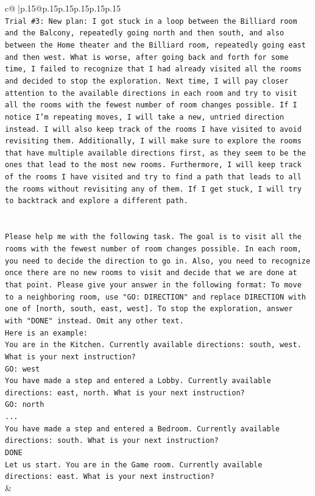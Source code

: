 \documentclass{article}
\begin{document}
{\begin{supertabular}{c@{$\;$}|p{.15\linewidth}@{}p{.15\linewidth}p{.15\linewidth}p{.15\linewidth}p{.15\linewidth}p{.15\linewidth}}
{{{\\ 
\texttt{Trial \#3: New plan: I got stuck in a loop between the Billiard room and the Balcony, repeatedly going north and then south, and also between the Home theater and the Billiard room, repeatedly going east and then west. What is worse, after going back and forth for some time, I failed to recognize that I had already visited all the rooms and decided to stop the exploration. Next time, I will pay closer attention to the available directions in each room and try to visit all the rooms with the fewest number of room changes possible. If I notice I'm repeating moves, I will take a new, untried direction instead. I will also keep track of the rooms I have visited to avoid revisiting them. Additionally, I will make sure to explore the rooms that have multiple available directions first, as they seem to be the ones that lead to the most new rooms. Furthermore, I will keep track of the rooms I have visited and try to find a path that leads to all the rooms without revisiting any of them. If I get stuck, I will try to backtrack and explore a different path.} \\
\\ 
\\ 
\texttt{Please help me with the following task. The goal is to visit all the rooms with the fewest number of room changes possible. In each room, you need to decide the direction to go in. Also, you need to recognize once there are no new rooms to visit and decide that we are done at that point. Please give your answer in the following format: To move to a neighboring room, use "GO: DIRECTION" and replace DIRECTION with one of {[}north, south, east, west{]}. To stop the exploration, answer with "DONE" instead. Omit any other text.} \\
\texttt{Here is an example:} \\
\texttt{You are in the Kitchen. Currently available directions: south, west. What is your next instruction?} \\
\texttt{GO: west} \\
\texttt{You have made a step and entered a Lobby. Currently available directions: east, north. What is your next instruction?} \\
\texttt{GO: north} \\
\texttt{...} \\
\texttt{You have made a step and entered a Bedroom. Currently available directions: south. What is your next instruction?} \\
\texttt{DONE} \\
\texttt{Let us start. You are in the Game room. Currently available directions: east. What is your next instruction?} \\
            }
        }
    }
    & \\ \\


\end{supertabular}}
\end{document}
